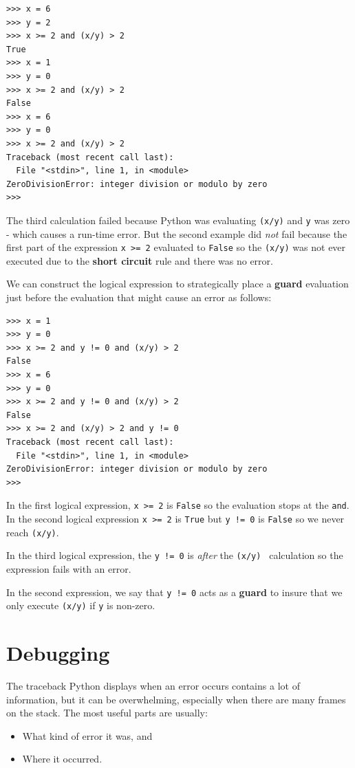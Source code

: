 \documentclass[10pt]{book}
\begin{document}
\beforeverb
\begin{verbatim}
>>> x = 6 
>>> y = 2
>>> x >= 2 and (x/y) > 2
True
>>> x = 1 
>>> y = 0
>>> x >= 2 and (x/y) > 2
False
>>> x = 6
>>> y = 0
>>> x >= 2 and (x/y) > 2
Traceback (most recent call last):
  File "<stdin>", line 1, in <module>
ZeroDivisionError: integer division or modulo by zero
>>> 
\end{verbatim}
\afterverb
%
The third calculation failed because Python was evaluating {\tt (x/y)}
and {\tt y} was zero - which causes a run-time error.  But the second example
did {\em not} fail because the first part of the expression {\tt x >= 2} 
evaluated to {\tt False} so the {\tt (x/y)} was not ever executed 
due to the {\bf short circuit} rule and there was no error.

We can construct the logical expression to strategically place a {\bf guard}
evaluation just before the evaluation that might cause an error as follows:

\beforeverb
\begin{verbatim}
>>> x = 1
>>> y = 0
>>> x >= 2 and y != 0 and (x/y) > 2
False
>>> x = 6 
>>> y = 0
>>> x >= 2 and y != 0 and (x/y) > 2
False
>>> x >= 2 and (x/y) > 2 and y != 0
Traceback (most recent call last):
  File "<stdin>", line 1, in <module>
ZeroDivisionError: integer division or modulo by zero
>>>
\end{verbatim}
\afterverb
%
In the first logical expression, {\tt x >= 2} is {\tt False} so the evaluation
stops at the {\tt and}.  In the second logical expression {\tt x >= 2} is {\tt True}
but {\tt y != 0} is {\tt False} so we never reach {\tt (x/y)}.

In the third logical expression, the {\tt y != 0} is {\em after} the 
{\tt (x/y) } calculation so the expression fails with an error.

In the second expression, we say that {\tt y != 0} acts as a {\bf guard}
to insure that we only execute {\tt (x/y)} if {\tt y} is non-zero.


\section{Debugging}
\label{whitespace}

The traceback Python displays when an error occurs contains
a lot of information, but it can be overwhelming, especially
when there are many frames on the stack.  The most
useful parts are usually:

\begin{itemize}

\item What kind of error it was, and

\item Where it occurred.

\end{itemize}
\end{document}
